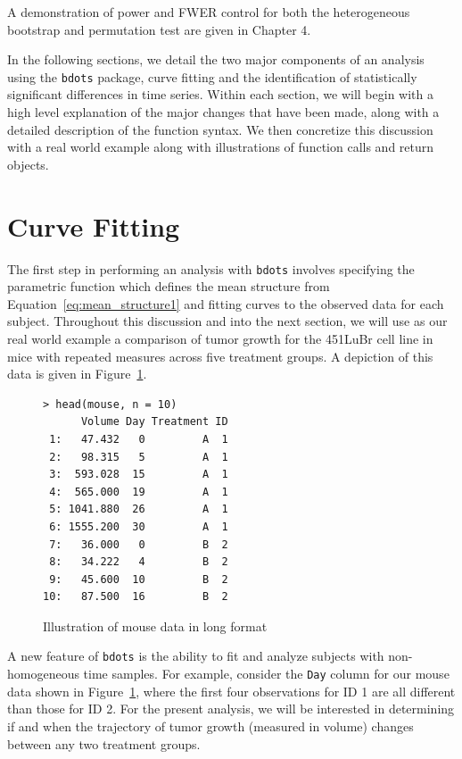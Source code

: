 \documentclass{article}
\newcommand{\xt}{\texttt}%
\begin{document}
A demonstration of power and FWER control for both the heterogeneous bootstrap and permutation test are given in Chapter 4.


In the following sections, we detail the two major components of an analysis using the \xt{bdots} package, curve fitting and the identification of statistically significant differences in time series. Within each section, we will begin with a high level explanation of the major changes that have been made, along with a detailed description of the function syntax. We then concretize this discussion with a real world example along with illustrations of function calls and return objects.


\section{Curve Fitting}

The first step in performing an analysis with \xt{bdots} involves specifying the parametric function which defines the mean structure from Equation~\ref{eq:mean_structure1} and fitting curves to the observed data for each subject. Throughout this discussion and into the next section, we will use as our real world example a comparison of tumor growth for the 451LuBr cell line in mice with repeated measures across five treatment groups. A depiction of this data is given in Figure~\ref{fig:mouse_head}.

\begin{singlespace}
\begin{figure}[H]
\centering
\begin{BVerbatim}
> head(mouse, n = 10)
      Volume Day Treatment ID
 1:   47.432   0         A  1
 2:   98.315   5         A  1
 3:  593.028  15         A  1
 4:  565.000  19         A  1
 5: 1041.880  26         A  1
 6: 1555.200  30         A  1
 7:   36.000   0         B  2
 8:   34.222   4         B  2
 9:   45.600  10         B  2
10:   87.500  16         B  2
\end{BVerbatim}
\caption{Illustration of mouse data in long format}
\label{fig:mouse_head}
\end{figure}
\end{singlespace}


A new feature of \xt{bdots} is the ability to fit and analyze subjects with non-homogeneous time samples. For example, consider the \xt{Day} column for our mouse data shown in Figure~\ref{fig:mouse_head}, where the first four observations for ID 1 are all different than those for ID 2. For the present analysis, we will be interested in determining if and when the trajectory of tumor growth (measured in volume) changes between any two treatment groups.
\end{document}
